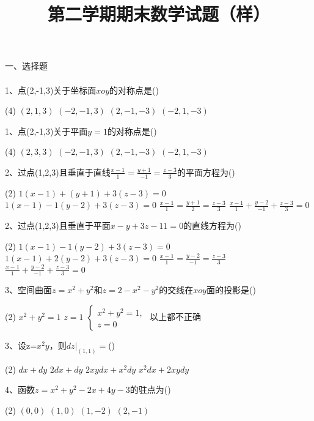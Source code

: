 \documentclass[12pt,a3paper]{article}
\title{第二学期期末数学试题（样）}
\date{}
\begin{document}
\maketitle


一、选择题
\\\\
1、点(2,-1,3)关于坐标面$xoy$的对称点是\hfill(\qquad)
\begin{tasks}(4)
    \task $(2,1,3)$
    \task $(-2,-1,3)$
    \task $(2,-1,-3)$
    \task $(-2,1,-3)$
    \\
\end{tasks}
1、点(2,-1,3)关于平面$y=1$的对称点是\hfill(\qquad)
\begin{tasks}(4)
    \task $(2,3,3)$
    \task $(-2,-1,3)$
    \task $(2,-1,-3)$
    \task $(-2,1,-3)$
    \\
\end{tasks}
2、过点(1,2,3)且垂直于直线$\frac{x-1}{1}=\frac{y+1}{-1}=\frac{z-3}{3}$的平面方程为\hfill(\qquad)
\begin{tasks}(2)
    \task $1(x-1)+(y+1)+3(z-3)=0$
    \task $1(x-1)-1(y-2)+3(z-3)=0$
    \task $\frac{x-1}{1}=\frac{y+1}{2}=\frac{z-3}{3}$
    \task $\frac{x-1}{1}+\frac{y-2}{-1}+\frac{z-3}{3}=0$
    \\
\end{tasks}
2、过点(1,2,3)且垂直于平面$x-y+3z-11=0$的直线方程为\hfill(\qquad)
\begin{tasks}(2)
    \task $1(x-1)-1(y-2)+3(z-3)=0$
    \task $1(x-1)+2(y-2)+3(z-3)=0$
    \task $\frac{x-1}{1}=\frac{y-2}{-1}=\frac{z-3}{3}$
    \\
    \task $\frac{x-1}{1}+\frac{y-2}{-1}+\frac{z-3}{3}=0$
\end{tasks}
3、空间曲面$z=x^2+y^2$和$z=2-x^2-y^2$的交线在$xoy$面的投影是\hfill(\qquad)
\begin{tasks}(2)
    \task $x^2+y^2=1$
    \task $z=1$
    \task $
    \begin{cases}
        x^2+y^2=1,\\
        z=0
    \end{cases}$
    \task 以上都不正确
    \\
\end{tasks}
3、设z=$x^2y$，则$dz|_{(1,1)}=$\hfill(\qquad)
\begin{tasks}(2)
    \task $dx+dy$
    \task $2dx+dy$
    \task $2xydx+x^2dy$
    \task $x^2dx+2xydy$
    \\
\end{tasks}
4、函数$z=x^2+y^2-2x+4y-3$的驻点为\hfill(\qquad)
\begin{tasks}(2)
    \task $(0,0)$
    \task $(1,0)$
    \task $(1,-2)$
    \task $(2,-1)$
    \\
\end{tasks}
\end{document}
